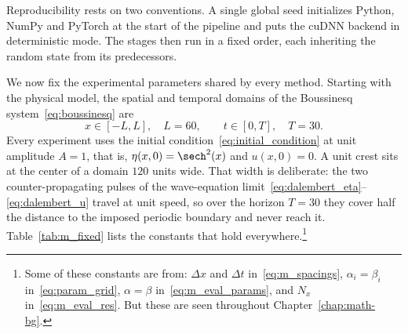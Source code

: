 Reproducibility rests on two conventions. A single global seed initializes Python, NumPy and PyTorch at the start of the pipeline and puts the cuDNN backend in deterministic mode. The stages then run in a fixed order, each inheriting the random state from its predecessors.

We now fix the experimental parameters shared by every method. Starting with the physical model, the spatial and temporal domains of the Boussinesq system~\eqref{eq:boussinesq} are
\begin{equation}\label{eq:m_domain}
    x \in [-L, L], \quad L = 60, \qquad t \in [0, T], \quad T = 30.
\end{equation}
Every experiment uses the initial condition~\eqref{eq:initial_condition} at unit amplitude $A = 1$, that is, $\eta(x,0) = \sech^2(x)$ and $u(x,0) = 0$. A unit crest sits at the center of a domain $120$ units wide. That width is deliberate: the two counter-propagating pulses of the wave-equation limit~\eqref{eq:dalembert_eta}--\eqref{eq:dalembert_u} travel at unit speed, so over the horizon $T = 30$ they cover half the distance to the imposed periodic boundary and never reach it. Table~\ref{tab:m_fixed} lists the constants that hold everywhere.\footnote{Some of these constants are from: $\Delta x$ and $\Delta t$ in~\eqref{eq:m_spacings}, $\alpha_i = \beta_i$ in~\eqref{eq:param_grid}, $\alpha = \beta$ in~\eqref{eq:m_eval_params}, and $N_x$ in~\eqref{eq:m_eval_res}. But these are seen throughout Chapter~\ref{chap:math-bg}.}

